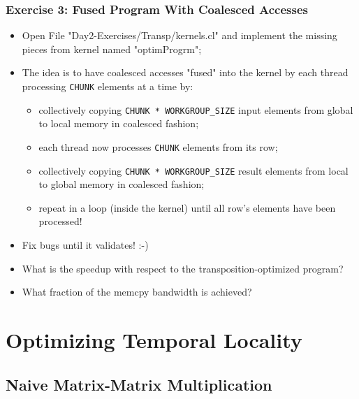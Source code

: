 \documentclass{beamer}
\begin{document}
\begin{frame}[fragile,t]
  \frametitle{Exercise 3: Fused Program With Coalesced Accesses}

\begin{itemize}
    \item Open File "Day2-Exercises/Transp/kernels.cl" and implement the missing pieces from kernel named "optimProgrm";\bigskip
    \item The idea is to have coalesced accesses "fused" into the kernel by each 
            thread processing {\tt CHUNK} elements at a time by:\smallskip
    \begin{itemize}
        \item collectively copying {\tt CHUNK * WORKGROUP\_SIZE} input elements from global to local memory
                in coalesced fashion;\smallskip
        \item each thread now processes {\tt CHUNK} elements from its row;\smallskip
        \item collectively copying {\tt CHUNK * WORKGROUP\_SIZE} result elements from local to global memory
                in coalesced fashion;\smallskip
        \item repeat in a loop (inside the kernel) until all row's elements have been processed! 
    \end{itemize}\bigskip
    \item Fix bugs until it validates! :-)\bigskip
    \item What is the speedup with respect to the transposition-optimized program?\bigskip
    \item What fraction of the memcpy bandwidth is achieved? 
\end{itemize}


\end{frame}


\section{Optimizing Temporal Locality}

\begin{frame}[fragile]
	\tableofcontents[currentsection]
\end{frame}

\subsection{Naive Matrix-Matrix Multiplication}
\end{document}
